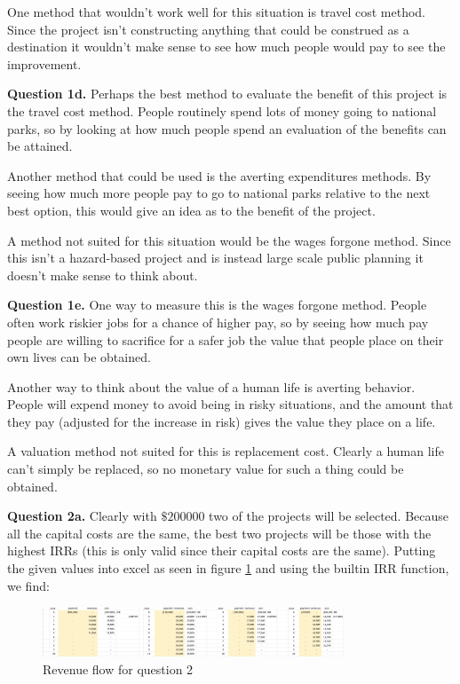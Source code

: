 \documentclass[letterpaper, reqno,11pt]{article}
\begin{document}
One method that wouldn't work well for this situation is travel cost method. Since the project isn't constructing anything that could be construed as a destination it wouldn't make sense to see how much people would pay to see the improvement. 

{\noindent\bf Question 1d.} Perhaps the best method to evaluate the benefit of this project is the travel cost method. People routinely spend lots of money going to national parks, so by looking at how much people spend an evaluation of the benefits can be attained. 

Another method that could be used is the averting expenditures methods. By seeing how much more people pay to go to national parks relative to the next best option, this would give an idea as to the benefit of the project. 

A method not suited for this situation would be the wages forgone method. Since this isn't a hazard-based project and is instead large scale public planning it doesn't make sense to think about. 

{\noindent\bf Question 1e.} One way to measure this is the wages forgone method. People often work riskier jobs for a chance of higher pay, so by seeing how much pay people are willing to sacrifice for a safer job the value that people place on their own lives can be obtained. 

Another way to think about the value of a human life is averting behavior. People will expend money to avoid being in risky situations, and the amount that they pay (adjusted for the increase in risk) gives the value they place on a life. 

A valuation method not suited for this is replacement cost. Clearly a human life can't simply be replaced, so no monetary value for such a thing could be obtained. 

{\noindent\bf Question 2a.} Clearly with $\$200000$ two of the projects will be selected. Because all the capital costs are the same, the best two projects will be those with the highest IRRs (this is only valid since their capital costs are the same). Putting the given values into excel as seen in figure \ref{fig:q2} and using the builtin IRR function, we find: 

\begin{figure}[htpb]
    \centering
    \includegraphics[width=0.8\textwidth]{q2}
    \caption{Revenue flow for question 2}
    \label{fig:q2}
\end{figure}
\end{document}
